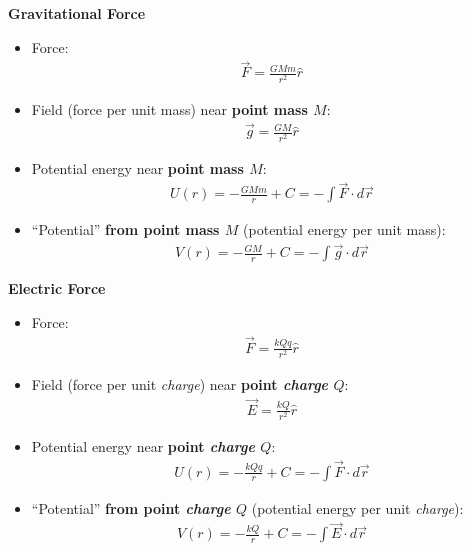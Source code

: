 \documentclass[aspectratio=169,
hyperref={colorlinks,urlcolor=blue}
]{beamer}
\begin{document}
{
\vspace{-0.25cm}
\textbf{Gravitational Force}
{\footnotesize 
\begin{itemize}
\item Force:
\begin{align*}
\vec F = \frac{GMm}{r^2}\hat r
\end{align*}

\item Field (force per unit mass) near \textbf{point mass $M$}:
\begin{align*}
\vec g = \frac{GM}{r^2}\hat r
\end{align*}

\item Potential energy near \textbf{point mass $M$}:
\begin{align*}
U(r) = -\frac{GMm}{r}+C=-\int \vec F\cdot d \vec r
\end{align*}

\item ``Potential'' \textbf{from point mass $M$} (potential energy per unit mass):
\begin{align*}
V(r) = -\frac{GM}{r}+C=-\int \vec g\cdot d \vec r
\end{align*}
\end{itemize}
}
}
{
\vspace{-0.25cm}
\textbf{Electric Force}
{\footnotesize 

\begin{itemize}
\item Force:
\begin{align*}
\vec F = \frac{kQq}{r^2}\hat r
\end{align*}

\item Field (force per unit \textit{charge}) near \textbf{point \textit{charge} $Q$}:
\begin{align*}
\vec E = \frac{kQ}{r^2}\hat r
\end{align*}

\item Potential energy near \textbf{point \textit{charge} $Q$}:
\begin{align*}
U(r) = -\frac{kQq}{r}+C=-\int \vec F\cdot d \vec r
\end{align*}

\item ``Potential'' \textbf{from point \textit{charge} $Q$} (potential energy per unit \textit{charge}):
\begin{align*}
V(r) = -\frac{kQ}{r}+C=-\int \vec E\cdot d \vec r
\end{align*}
\end{itemize}
}
}
\end{document}
